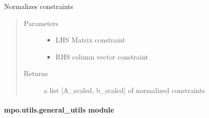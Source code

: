 \documentclass[letterpaper,10pt,english]{sphinxmanual}
\begin{document}
\begin{fulllineitems}
\label{\detokenize{mpo.utils:mpo.utils.constraint_utilities.scale_constraint}}
\sphinxAtStartPar
Normalizes constraints
\begin{quote}\begin{description}
\item[{Parameters}] \leavevmode\begin{itemize}
\item {} 
\sphinxAtStartPar
{} \textendash{} LHS Matrix constraint

\item {} 
\sphinxAtStartPar
{} \textendash{} RHS column vector constraint

\end{itemize}

\item[{Returns}] \leavevmode
\sphinxAtStartPar
a list {[}A\_scaled, b\_scaled{]} of normalized constraints

\end{description}\end{quote}

\end{fulllineitems}



\paragraph{mpo.utils.general\_utils module}
\label{\detokenize{mpo.utils:module-mpo.utils.general_utils}}\label{\detokenize{mpo.utils:mpo-utils-general-utils-module}}
\end{document}
